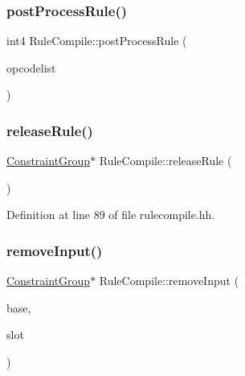 \mbox{\label{class_rule_compile_af9a583f4be2f91cf257b018c2e08b480}} 
\subsubsection{\texorpdfstring{postProcessRule()}{postProcessRule()}}
{\footnotesize\ttfamily int4 Rule\+Compile\+::post\+Process\+Rule (\begin{DoxyParamCaption}\item[{vector$<$ \mbox{\hyperlink{opcodes_8hh_abeb7dfb0e9e2b3114e240a405d046ea7}{Op\+Code}} $>$ \&}]{opcodelist }\end{DoxyParamCaption})}

\mbox{\label{class_rule_compile_a2bb6af56107e7650098501eb07c781b7}} 
\subsubsection{\texorpdfstring{releaseRule()}{releaseRule()}}
{\footnotesize\ttfamily \mbox{\hyperlink{class_constraint_group}{Constraint\+Group}}$\ast$ Rule\+Compile\+::release\+Rule (\begin{DoxyParamCaption}\item[{void}]{ }\end{DoxyParamCaption})\hspace{0.3cm}{\ttfamily [inline]}}



Definition at line 89 of file rulecompile.\+hh.

\mbox{\label{class_rule_compile_a53a18194e1f9ee8d2fb24fcba183e8be}} 
\subsubsection{\texorpdfstring{removeInput()}{removeInput()}}
{\footnotesize\ttfamily \mbox{\hyperlink{class_constraint_group}{Constraint\+Group}}$\ast$ Rule\+Compile\+::remove\+Input (\begin{DoxyParamCaption}\item[{\mbox{\hyperlink{class_constraint_group}{Constraint\+Group}} $\ast$}]{base,  }\item[{\mbox{\hyperlink{class_r_h_s_constant}{R\+H\+S\+Constant}} $\ast$}]{slot }\end{DoxyParamCaption})}

